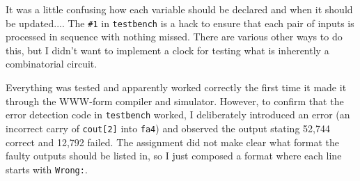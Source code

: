 \documentclass{sig-alternate-05-2015}
\begin{document}
It was a little confusing how each variable should be declared
and when it should be updated....  The \texttt{\#1} in
\texttt{testbench} is a hack to ensure that each pair of inputs
is processed in sequence with nothing missed.  There are various
other ways to do this, but I didn't want to implement a clock for
testing what is inherently a combinatorial circuit.

Everything was tested and apparently worked correctly the first
time it made it through the WWW-form compiler and simulator.
However, to confirm that the error detection code in
\texttt{testbench} worked, I deliberately introduced an error
(an incorrect carry of \texttt{cout[2]} into
\texttt{fa4}) and observed the output stating 52,744 correct and
12,792 failed. The assignment did not make clear what format the
faulty outputs should be listed in, so I just composed a format
where each line starts with \texttt{Wrong:}.
\end{document}
